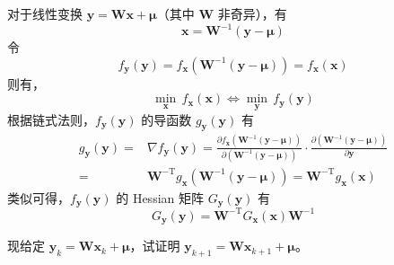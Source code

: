 \documentclass[cn,mtpro2,12pt]{elegantbook}
\begin{document}
\begin{solution}
    对于线性变换 $\mathbf{y}=\mathbf{W}\mathbf{x}+\boldsymbol{\mu}$（其中 $\mathbf{W}$ 非奇异），有
    \begin{equation}
        \mathbf{x}=\mathbf{W}^{-1}\left(\mathbf{y}-\boldsymbol{\mu}\right)
    \end{equation}
    令
    \begin{equation}
        f_{\mathbf{y}}(\mathbf{y})=f_{\mathbf{x}}\left(\mathbf{W}^{-1}\left(\mathbf{y}-\boldsymbol{\mu}\right)\right)=f_{\mathbf{x}}(\mathbf{x})
    \end{equation}
    则有，
    \begin{equation}
        \min_{\mathbf{x}}\,f_{\mathbf{x}}(\mathbf{x})\Longleftrightarrow\min_{\mathbf{y}}\,f_{\mathbf{y}}(\mathbf{y})
    \end{equation}
    根据链式法则，$f_{\mathbf{y}}(\mathbf{y})$ 的导函数 $g_{\mathbf{y}}(\mathbf{y})$ 有
    \begin{equation}
        \begin{aligned}
            g_{\mathbf{y}}(\mathbf{y})= & \nabla f_{\mathbf{y}}(\mathbf{y})=\frac{\partial f_{\mathbf{x}}\left(\mathbf{W}^{-1}\left(\mathbf{y}-\boldsymbol{\mu}\right)\right)}{\partial\left(\mathbf{W}^{-1}\left(\mathbf{y}-\boldsymbol{\mu}\right)\right)}\cdot\frac{\partial\left(\mathbf{W}^{-1}\left(\mathbf{y}-\boldsymbol{\mu}\right)\right)}{\partial\mathbf{y}} \\
            =                           & \mathbf{W}^{-\mathrm{T}}g_{\mathbf{x}}(\mathbf{W}^{-1}\left(\mathbf{y}-\boldsymbol{\mu}\right))=\mathbf{W}^{-\mathrm{T}}g_{\mathbf{x}}(\mathbf{x})
        \end{aligned}
    \end{equation}
    类似可得，$f_{\mathbf{y}}(\mathbf{y})$ 的 Hessian 矩阵 $G_{\mathbf{y}}(\mathbf{y})$ 有
    \begin{equation}
        G_{\mathbf{y}}(\mathbf{y})=\mathbf{W}^{-\mathrm{T}}G_{\mathbf{x}}(\mathbf{x})\mathbf{W}^{-1}
    \end{equation}

    现给定 $\mathbf{y}_{k}=\mathbf{W}\mathbf{x}_{k}+\boldsymbol{\mu}$，试证明 $\mathbf{y}_{k+1}=\mathbf{W}\mathbf{x}_{k+1}+\boldsymbol{\mu}$。



\end{solution}
\end{document}

